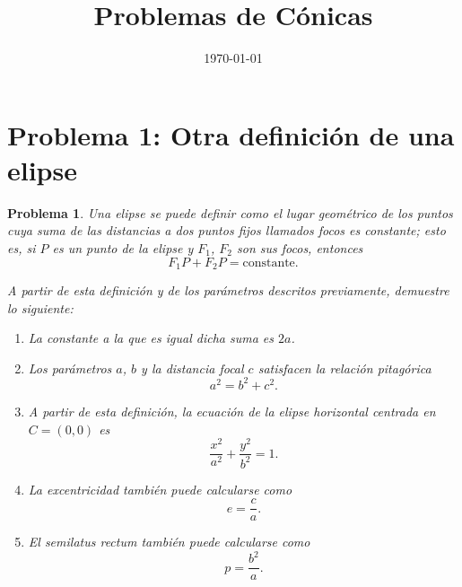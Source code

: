\documentclass[11pt]{article}
\title{Problemas de Cónicas}
\author{}
\date{\today}
\theoremstyle{prismstyle}
\newtheorem{problem}{Problema}
\newcommand{\problemsection}[2]{
  \section{#1}
  \begin{problem}
  #2
  \end{problem}
}
\begin{document}
\maketitle

\tableofcontents


\problemsection{Problema 1: Otra definición de una elipse}{
Una elipse se puede definir como el lugar geométrico de los puntos cuya suma de las distancias a dos puntos fijos llamados focos es constante; esto es, si $P$ es un punto de la elipse y $F_1$, $F_2$ son sus focos, entonces
\[
F_1P + F_2P = \text{constante}.
\]

A partir de esta definición y de los parámetros descritos previamente, demuestre lo siguiente:

\begin{enumerate}[label=\alph*)]
  \item La constante a la que es igual dicha suma es $2a$.
  \item Los parámetros $a$, $b$ y la distancia focal $c$ satisfacen la relación pitagórica
  \[
  a^2 = b^2 + c^2.
  \]
  \item A partir de esta definición, la ecuación de la elipse horizontal centrada en $C=(0,0)$ es
  \[
  \frac{x^2}{a^2} + \frac{y^2}{b^2} = 1.
  \]
  \item La excentricidad también puede calcularse como
  \[
  e = \frac{c}{a}.
  \]
  \item El semilatus rectum también puede calcularse como
  \[
  p = \frac{b^2}{a}.
  \]
\end{enumerate}
}
\end{document}
